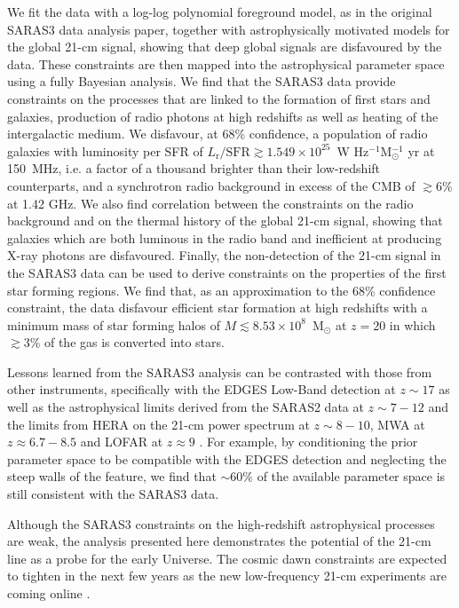 We fit the data with a log-log polynomial foreground model, as in the original SARAS3 data analysis paper, together with astrophysically motivated models for the global 21-cm signal, showing that deep global signals are disfavoured by the data. These constraints are then mapped into the astrophysical parameter space using a fully Bayesian analysis. We find that the SARAS3 data provide constraints on the processes that are linked to the formation of first stars and galaxies, production of radio photons at high redshifts as well as heating of the intergalactic medium.
We disfavour, at 68\% confidence, a population of radio galaxies with luminosity per SFR of $L_\mathrm{r}/\mathrm{SFR} \gtrsim 1.549 \times 10^{25}$~W Hz$^{-1}$M$_\odot^{-1}$ yr at 150~MHz, i.e. a factor of a thousand brighter than their low-redshift counterparts, and a synchrotron radio background in excess of the CMB of  $\gtrsim 6\%$ at 1.42 GHz. We also find correlation between the constraints on the radio background and on the thermal history of the global 21-cm signal, showing that galaxies which are both luminous in the radio band and inefficient at producing X-ray photons are disfavoured. Finally, the non-detection of the 21-cm signal in the SARAS3 data can be used to derive constraints on the properties of the first star forming regions. We find that, as an approximation to the 68\% confidence constraint, the data disfavour efficient star formation at high redshifts with a minimum mass of star forming halos of $M \lesssim 8.53\times10^8$~M$_\odot$ at $z=20$ in which $\gtrsim 3\%$ of the gas is converted into stars. 

Lessons learned from the SARAS3 analysis can be contrasted with those from other instruments, specifically with the EDGES Low-Band detection at $z\sim17$ as well as the astrophysical limits derived from the SARAS2 data at $z\sim7-12$ and the limits from HERA on the 21-cm power spectrum at $z\sim8-10$, MWA at $z\approx 6.7 - 8.5$ \cite{Trott_mwa_2020, Ghara_MWA_2021} and LOFAR at $z\approx 9$ \cite{Gehlot_lofar_2019, Greig_LOFAR_2021}. For example, by conditioning the prior parameter space to be compatible with the EDGES detection and neglecting the steep walls of the feature, we find that $\sim60\%$ of the available parameter space is still consistent with the SARAS3 data. 

Although the SARAS3 constraints on the  high-redshift astrophysical processes are weak, the analysis presented here demonstrates the potential of the 21-cm line as a probe for the early Universe. The cosmic dawn constraints are expected to tighten in the next few years as the new low-frequency 21-cm experiments are coming online \cite{Zarka_nenuFar_2018, Anstey_REACH_2021, de_lera_acedo_reach_2022}.


